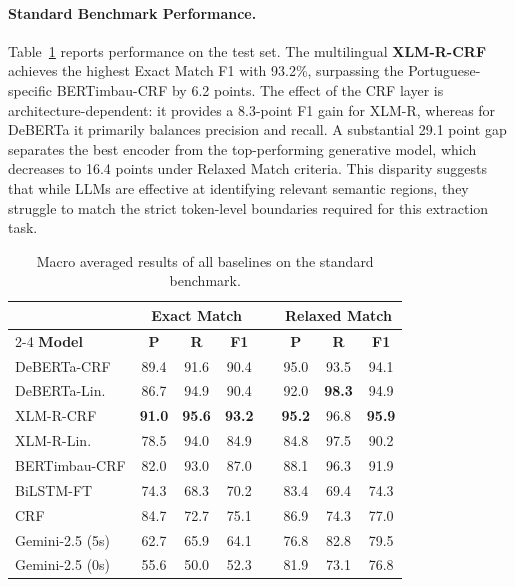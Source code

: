 \documentclass[11pt]{article}
\begin{document}
\paragraph{Standard Benchmark Performance.}
Table~\ref{tab:main_results_compact} reports performance on the test set. The multilingual \textbf{XLM-R-CRF} achieves the highest Exact Match F1 with 93.2\%, surpassing the Portuguese-specific BERTimbau-CRF by 6.2 points. The effect of the CRF layer is architecture-dependent: it provides a 8.3-point F1 gain for XLM-R, whereas for DeBERTa it primarily balances precision and recall. A substantial 29.1 point gap separates the best encoder from the top-performing generative model, which decreases to 16.4 points under Relaxed Match criteria. This disparity suggests that while LLMs are effective at identifying relevant semantic regions, they struggle to match the strict token-level boundaries required for this extraction task.

\begin{table}[ht!]
\centering
\caption{Macro averaged results of all baselines on the standard benchmark.}
\label{tab:main_results_compact}
\footnotesize
\setlength{\tabcolsep}{0pt} 
\begin{tabular*}{\columnwidth}{@{\extracolsep{\fill}} l ccc c ccc @{}}
\toprule
& \multicolumn{3}{c}{\textbf{Exact Match}} && \multicolumn{3}{c}{\textbf{Relaxed Match}} \\
\cmidrule{2-4} \cmidrule{6-8}
\textbf{Model} & \textbf{P} & \textbf{R} & \textbf{F1} && \textbf{P} & \textbf{R} & \textbf{F1} \\
\midrule
DeBERTa-CRF      & 89.4 & 91.6 & 90.4 && 95.0 & 93.5 & 94.1 \\
DeBERTa-Lin.     & 86.7 & 94.9 & 90.4 && 92.0 & \textbf{98.3} & 94.9 \\
XLM-R-CRF        & \textbf{91.0} & \textbf{95.6} & \textbf{93.2} && \textbf{95.2} & 96.8 & \textbf{95.9} \\
XLM-R-Lin.       & 78.5 & 94.0 & 84.9 && 84.8 & 97.5 & 90.2 \\
BERTimbau-CRF    & 82.0 & 93.0 & 87.0 && 88.1 & 96.3 & 91.9 \\
BiLSTM-FT        & 74.3 & 68.3 & 70.2 && 83.4 & 69.4 & 74.3 \\
CRF              & 84.7 & 72.7 & 75.1 && 86.9 & 74.3 & 77.0 \\
\midrule
Gemini-2.5 (5s)  & 62.7 & 65.9 & 64.1 && 76.8 & 82.8 & 79.5 \\
Gemini-2.5 (0s)  & 55.6 & 50.0 & 52.3 && 81.9 & 73.1 & 76.8 \\
\bottomrule
\end{tabular*}
\end{table}
\end{document}
